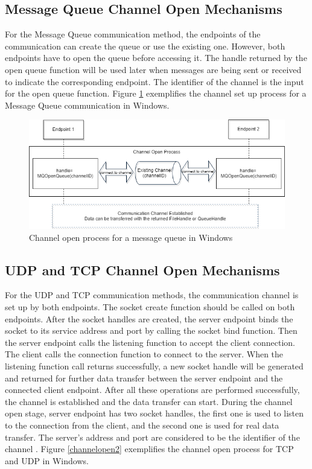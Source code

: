 \subsection{Message Queue Channel Open Mechanisms} 
For the Message Queue communication method, the endpoints of the communication can create the queue or use the existing one. However, both endpoints have to open the queue before accessing it. The handle returned by the open queue function will be used later when messages are being sent or received to indicate the corresponding endpoint. The identifier of the channel is the input for the open queue function. \cite{WinMSMQ} Figure \ref{msmqopen} exemplifies the channel set up process for a Message Queue communication in Windows.

\begin{figure}[H]
\centerline{\includegraphics[scale=0.5]{Figures/msmqchannelopen}}
 \caption{Channel open process for a message queue in Windows}
\label{msmqopen}
\end{figure}

\subsection{UDP and TCP Channel Open Mechanisms} 
For the UDP and TCP communication methods, the communication channel is set up by both endpoints. The socket create function should be called on both endpoints. After the socket handles are created, the server endpoint binds the socket to its service address and port by calling the socket bind function. Then the server endpoint calls the listening function to accept the client connection. The client calls the connection function to connect to the server. When the listening function call returns successfully, a new socket handle will be generated and returned for further data transfer between the server endpoint and the connected client endpoint. After all these operations are performed successfully, the channel is established and the data transfer can start. During the channel open stage, server endpoint has two socket handles, the first one is used to listen to the connection from the client, and the second one is used for real data transfer. The server's address and port are considered to be the identifier of the channel \cite{winsock}. Figure \ref{channelopen2} exemplifies the channel open process for TCP and UDP in Windows.
    
